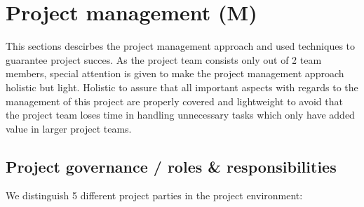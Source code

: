 \section{Project management (M)}
\label{sec:project-management}
This sections descirbes the project management approach and used techniques to guarantee project succes.
As the project team consists only out of 2 team members, special attention is given to make the project management approach holistic but light.
Holistic to assure that all important aspects with regards to the management of this project are properly covered and lightweight to avoid that the project team loses time in handling unnecessary tasks which only have added value in larger project teams.
\subsection{Project governance / roles \& responsibilities}
We distinguish 5 different project parties in the project environment:
